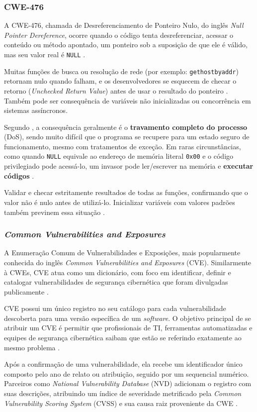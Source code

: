\documentclass[
    12pt,                %
    openright,           %
    oneside,             %
    a4paper,             %
    english,             %
    brazil               %
]{abntex2}
\begin{document}
\subsubsection{CWE-476}
\label{sec:476}
\par
A CWE-476, chamada de Desreferenciamento de Ponteiro Nulo, do inglês \textit{Null Pointer Dereference}, ocorre quando o código tenta desreferenciar, acessar o conteúdo ou método apontado, um ponteiro sob a suposição de que ele é válido, mas seu valor real é \texttt{NULL} \cite{cwe476}.
\par
Muitas funções de busca ou resolução de rede (por exemplo: \texttt{gethostbyaddr}) retornam nulo quando falham, e os desenvolvedores se esquecem de checar o retorno (\textit{Unchecked Return Value}) antes de usar o resultado do ponteiro \cite{cwe476}.
Também pode ser consequência de variáveis não inicializadas ou concorrência em sistemas assíncronos.
\par
Segundo , a consequência geralmente é o \textbf{travamento completo do processo} (DoS), sendo muito difícil que o programa se recupere para um estado seguro de funcionamento, mesmo com tratamentos de exceção.
Em raras circunstâncias, como quando \texttt{NULL} equivale ao endereço de memória literal \texttt{0x00} e o código privilegiado pode acessá-lo, um invasor pode ler/escrever na memória e \textbf{executar códigos} \cite{cwe476}.
\par
Validar e checar estritamente resultados de todas as funções, confirmando que o valor não é nulo antes de utilizá-lo. Inicializar variáveis com valores padrões também previnem essa situação \cite{cwe476}.

\subsubsection{\textit{Common Vulnerabilities and Exposures}}
\label{sec:cves}
\par
A Enumeração Comum de Vulnerabilidades e Exposições, mais popularmente conhecida do inglês \textit{Common Vulnerabilities and Exposures} (CVE).
Similarmente à CWEs, CVE atua como um dicionário, com foco em identificar, definir e catalogar vulnerabilidades de segurança cibernética que foram divulgadas publicamente \cite{cveabout}.
\par 
CVE possui um único registro no seu catálogo para cada vulnerabilidade descoberta para uma versão específica de um \textit{software}.
O objetivo principal de se atribuir um CVE é permitir que profissionais de TI, ferramentas automatizadas e equipes de segurança cibernética saibam que estão se referindo exatamente ao mesmo problema \cite{cveabout}.
\par
Após a confirmação de uma vulnerabilidade, ela recebe um identificador único composto pelo ano de relato ou atribuição, seguido por um sequencial numérico.
Parceiros como \textit{National Vulnerability Database} (NVD) adicionam o registro com suas descrições, atribuindo um índice de severidade metrificado pela \textit{Common Vulnerability Scoring System} (CVSS) e sua causa raiz proveniente da CWE \cite{cveabout}.
\end{document}
